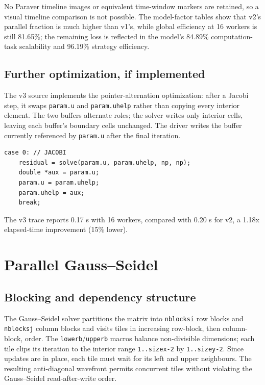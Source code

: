 \documentclass[11pt,a4paper]{article}
\begin{document}
No Paraver timeline images or equivalent time-window markers are
retained, so a visual timeline comparison is not possible. The
model-factor tables show that v2's parallel fraction is much higher
than v1's, while global efficiency at 16 workers is still 81.65\%;
the remaining loss is reflected in the model's 84.89\% computation-task
scalability and 96.19\% strategy efficiency.

\subsection{Further optimization, if implemented}

The v3 source implements the pointer-alternation optimization: after a
Jacobi step, it swaps \texttt{param.u} and \texttt{param.uhelp} rather
than copying every interior element. The two buffers alternate roles;
the solver writes only interior cells, leaving each buffer's boundary
cells unchanged. The driver writes the buffer currently referenced by
\texttt{param.u} after the final iteration.

\begin{lstlisting}[caption={Jacobi pointer alternation in the v3 driver.}]
case 0: // JACOBI
    residual = solve(param.u, param.uhelp, np, np);
    double *aux = param.u;
    param.u = param.uhelp;
    param.uhelp = aux;
    break;
\end{lstlisting}

The v3 trace reports 0.17 s with 16 workers, compared with 0.20 s
for v2, a 1.18x elapsed-time improvement (15\% lower).

\FloatBarrier

\section{Parallel Gauss--Seidel}

\subsection{Blocking and dependency structure}

The Gauss--Seidel solver partitions the matrix into
\texttt{nblocksi} row blocks and \texttt{nblocksj} column blocks and
visits tiles in increasing row-block, then column-block, order.
The \texttt{lowerb}/\texttt{upperb} macros balance non-divisible
dimensions; each tile clips its iteration to the interior range
\texttt{1..sizex-2} by \texttt{1..sizey-2}. Since updates are in place,
each tile must wait for its left and upper neighbours. The resulting
anti-diagonal wavefront permits concurrent tiles without violating the
Gauss--Seidel read-after-write order.
\end{document}
